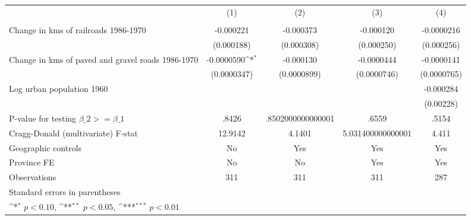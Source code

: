 {
\def\sym#1{\ifmmode^{#1}\else\(^{#1}\)\fi}
\begin{tabular}{l*{4}{c}}
\hline\hline
                &\multicolumn{1}{c}{(1)}&\multicolumn{1}{c}{(2)}&\multicolumn{1}{c}{(3)}&\multicolumn{1}{c}{(4)}\\
                &\multicolumn{1}{c}{}&\multicolumn{1}{c}{}&\multicolumn{1}{c}{}&\multicolumn{1}{c}{}\\
\hline
Change in kms of railroads 1986-1970&-0.000221         &-0.000373         &-0.000120         &-0.0000216         \\
                &(0.000188)         &(0.000308)         &(0.000250)         &(0.000256)         \\
[1em]
Change in kms of paved and gravel roads 1986-1970&-0.0000590\sym{*}  &-0.000130         &-0.0000444         &-0.0000141         \\
                &(0.0000347)         &(0.0000899)         &(0.0000746)         &(0.0000765)         \\
[1em]
Log urban population 1960&                  &                  &                  &-0.000284         \\
                &                  &                  &                  &(0.00228)         \\
\hline
P-value for testing $\beta\_{2} >= \beta\_{1}$&    .8426         &.8502000000000001         &    .6559         &    .5154         \\
Cragg-Donald (multivariate) F-stat&  12.9142         &   4.1401         &5.031400000000001         &    4.411         \\
Geographic controls&       No         &      Yes         &      Yes         &      Yes         \\
Province FE     &       No         &       No         &      Yes         &      Yes         \\
Observations    &      311         &      311         &      311         &      287         \\
\hline\hline
\multicolumn{5}{l}{\footnotesize Standard errors in parentheses}\\
\multicolumn{5}{l}{\footnotesize \sym{*} \(p<0.10\), \sym{**} \(p<0.05\), \sym{***} \(p<0.01\)}\\
\end{tabular}
}
